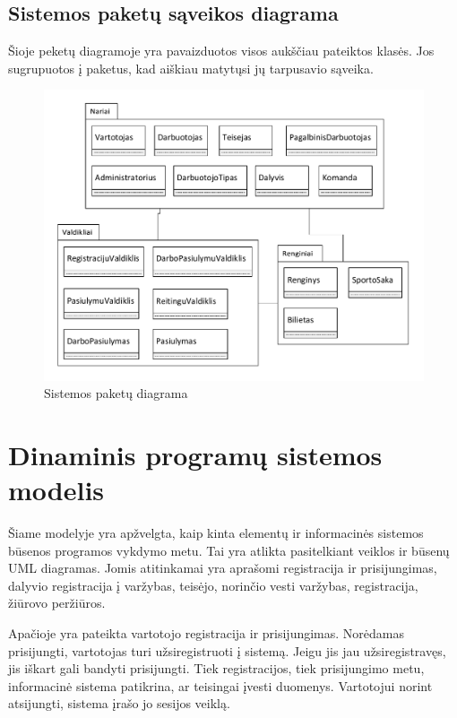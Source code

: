 \documentclass{VUMIFPSkursinis}
\begin{document}
		\subsection*{Sistemos paketų sąveikos diagrama}
		
		Šioje peketų diagramoje yra pavaizduotos visos aukščiau pateiktos klasės.
		Jos sugrupuotos į paketus, kad aiškiau matytųsi jų tarpusavio sąveika.
		
		\begin{figure}[H]
			\centering
			\includegraphics[width=\textwidth]{img/PaketuDiagrama}
			\caption{Sistemos paketų diagrama}
			\label{fig:PaketuDiagrama}
		\end{figure}
		
    \section{Dinaminis programų sistemos modelis} \label{dinaminisPSModelis}
        Šiame modelyje yra apžvelgta, kaip kinta elementų ir informacinės sistemos būsenos programos vykdymo metu. 
		Tai yra atlikta pasitelkiant veiklos ir būsenų UML diagramas.
		Jomis atitinkamai yra aprašomi registracija ir prisijungimas,
		dalyvio registracija į varžybas, teisėjo, norinčio vesti varžybas, registracija, žiūrovo peržiūros.
		\par
		\par
		Apačioje yra pateikta vartotojo registracija ir prisijungimas.
		Norėdamas prisijungti, vartotojas turi užsiregistruoti į sistemą.
		Jeigu jis jau užsiregistravęs, jis iškart gali bandyti prisijungti.
		Tiek registracijos, tiek prisijungimo metu, informacinė sistema patikrina, ar teisingai įvesti duomenys.
		Vartotojui norint atsijungti, sistema įrašo jo sesijos veiklą.
		
\end{document}
